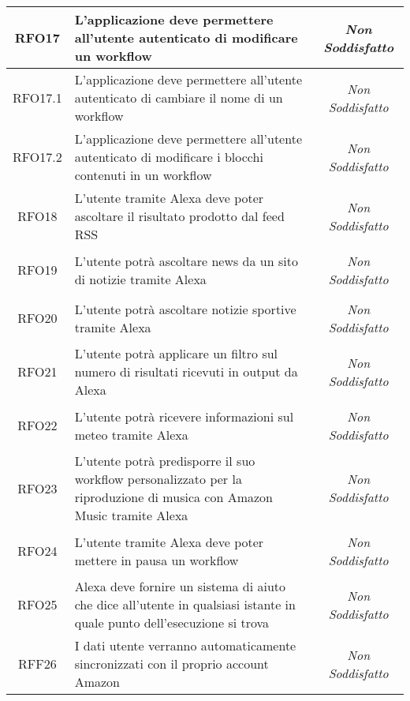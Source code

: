\begin{longtable}{|c|>{\centering}m{7cm}|c|}
	\hypertarget{RFO17}{RFO17} & L'applicazione deve permettere all'utente autenticato di modificare un workflow & \textit{Non Soddisfatto}\\ \hline
	
	\hypertarget{RFO17.1}{RFO17.1} & L'applicazione deve permettere all'utente autenticato di cambiare il nome di un workflow & \textit{Non Soddisfatto}\\ \hline
	
	\hypertarget{RFO17.2}{RFO17.2} & L'applicazione deve permettere all'utente autenticato di modificare i blocchi contenuti in un workflow & \textit{Non Soddisfatto}\\ \hline
	
	\hypertarget{RFO18}{RFO18} & L'utente tramite Alexa deve poter ascoltare il risultato prodotto dal feed RSS & \textit{Non Soddisfatto}\\ \hline
	
	\hypertarget{RFO19}{RFO19} & L'utente potrà ascoltare news da un sito di notizie tramite Alexa & \textit{Non Soddisfatto}\\ \hline
	
	\hypertarget{RFO20}{RFO20} & L'utente potrà ascoltare notizie sportive tramite Alexa & \textit{Non Soddisfatto}\\ \hline
	
	\hypertarget{RFO21}{RFO21} & L'utente potrà applicare un filtro sul numero di risultati ricevuti in output da Alexa & \textit{Non Soddisfatto}\\ \hline
	
	\hypertarget{RFO22}{RFO22} & L'utente potrà ricevere informazioni sul meteo tramite Alexa & \textit{Non Soddisfatto}\\ \hline
	
	\hypertarget{RFO23}{RFO23} & L'utente potrà predisporre il suo workflow personalizzato per la riproduzione di musica con Amazon Music tramite Alexa & \textit{Non Soddisfatto}\\ \hline
	
	\hypertarget{RFO24}{RFO24} & L'utente tramite Alexa deve poter mettere in pausa un workflow & \textit{Non Soddisfatto}\\ \hline
	
	\hypertarget{RFO25}{RFO25} & Alexa deve fornire un sistema di aiuto che dice all'utente in qualsiasi istante in quale punto dell'esecuzione si trova & \textit{Non Soddisfatto}\\ \hline
	
	\hypertarget{RFF26}{RFF26} & I dati utente verranno automaticamente sincronizzati con il proprio account Amazon & \textit{Non Soddisfatto}\\ \hline
	

\end{longtable}
